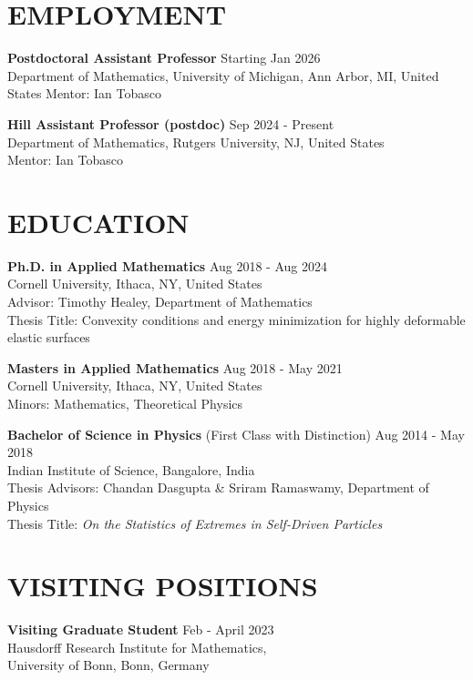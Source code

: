 \documentclass[margin]{res} %
\begin{document}
\begin{resume}

\section{EMPLOYMENT}
\textbf{Postdoctoral Assistant Professor} \hfill Starting Jan 2026\\
Department of Mathematics, University of Michigan, Ann Arbor, MI, United States
Mentor: Ian Tobasco

\textbf{Hill Assistant Professor (postdoc)} \hfill Sep 2024 - Present\\	
Department of Mathematics, Rutgers University, NJ, United States\\
Mentor: Ian Tobasco

\section{EDUCATION}  
\textbf{Ph.D. in Applied Mathematics} \hfill Aug 2018 - Aug 2024\\
Cornell University, Ithaca, NY, United States\\
Advisor: Timothy Healey, Department of Mathematics\\
Thesis Title: Convexity conditions and energy minimization for highly deformable elastic surfaces
\smallskip

\textbf{Masters in Applied Mathematics} \hfill Aug 2018 - May 2021\\
Cornell University, Ithaca, NY, United States\\
Minors: Mathematics, Theoretical Physics
\smallskip

\textbf{Bachelor of Science in Physics} (First Class with Distinction) \hfill Aug 2014 - May 2018 \\
Indian Institute of Science, Bangalore, India\\
Thesis Advisors: Chandan Dasgupta \& Sriram Ramaswamy, Department of Physics\\
Thesis Title: \textit{On the Statistics of Extremes in Self-Driven Particles}

\section{VISITING POSITIONS}
\textbf{Visiting Graduate Student} \hfill Feb - April 2023\\
Hausdorff Research Institute for Mathematics,\\
University of Bonn, Bonn, Germany
\smallskip


\end{resume}
\end{document}
